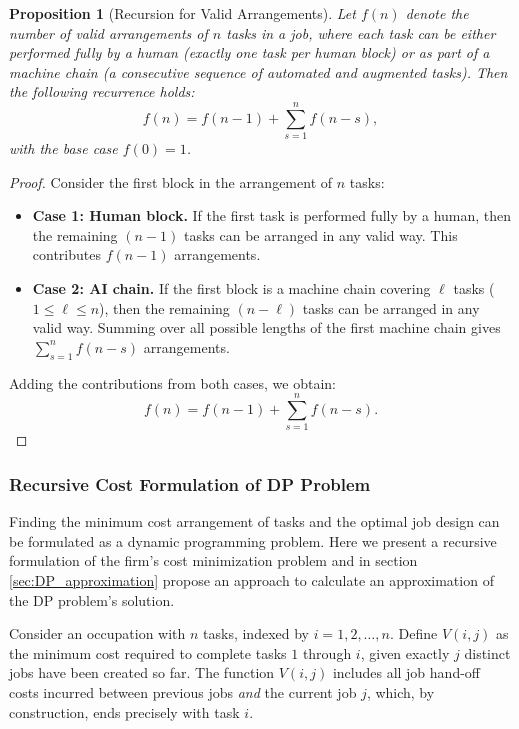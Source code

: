 \documentclass{article}
\theoremstyle{plain}
\theoremstyle{plain}
\newtheorem{proposition}[theorem]{Proposition}
\begin{document}
\begin{proposition}[Recursion for Valid Arrangements] \label{proposition:num_arrangements}
  Let \(f(n)\) denote the number of valid arrangements of \(n\) tasks in a job, where each task can be either performed fully by a human (exactly one task per human block) or as part of a machine chain (a consecutive sequence of automated and augmented tasks). Then the following recurrence holds:
  \[
  f(n) = f(n-1) + \sum_{s=1}^{n} f(n-s),
  \]
  with the base case \(f(0) = 1\).
\end{proposition}

\begin{proof}
Consider the first block in the arrangement of \(n\) tasks:
\begin{itemize}
    \item \textbf{Case 1: Human block.} If the first task is performed fully by a human, then the remaining \((n-1)\) tasks can be arranged in any valid way. This contributes \(f(n-1)\) arrangements.
    \item \textbf{Case 2: AI chain.} If the first block is a machine chain covering \(\ell\) tasks (\(1 \leq \ell \leq n\)), then the remaining \((n-\ell)\) tasks can be arranged in any valid way. Summing over all possible lengths of the first machine chain gives \(\sum_{s=1}^{n} f(n-s)\) arrangements.
\end{itemize}
Adding the contributions from both cases, we obtain:
\[
f(n) = f(n-1) + \sum_{s=1}^{n} f(n-s).
\]
\end{proof}


\subsubsection{Recursive Cost Formulation of DP Problem}
\label{sec:recursive_formulation}
Finding the minimum cost arrangement of tasks and the optimal job design can be formulated as a dynamic programming problem.
Here we present a recursive formulation of the firm's cost minimization problem and in section \ref{sec:DP_approximation} propose an approach to calculate an approximation of the DP problem's solution.

Consider an occupation with $n$ tasks, indexed by \(i = 1, 2, \ldots, n\).
Define $V(i,j)$ as the minimum cost required to complete tasks $1$ through $i$, given exactly $j$ distinct jobs have been created so far.
The function $V(i,j)$ includes all job hand-off costs incurred between previous jobs \emph{and} the current job $j$, which, by construction, ends precisely with task $i$.
\end{document}
